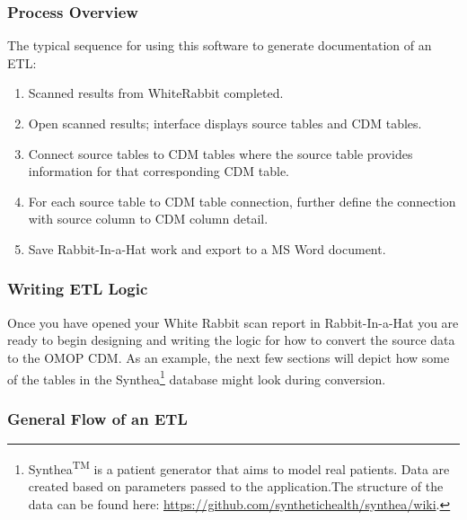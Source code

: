 \documentclass[11pt]{book}
\providecommand{\tightlist}{%
  \setlength{\itemsep}{0pt}\setlength{\parskip}{0pt}}
\let\rmarkdownfootnote\footnote%
\def\footnote{\protect\rmarkdownfootnote}
\theoremstyle{definition}
\theoremstyle{definition}
\theoremstyle{definition}
\theoremstyle{remark}
\begin{document}
\subsubsection*{Process Overview}\label{process-overview-1}

The typical sequence for using this software to generate documentation
of an ETL:

\begin{enumerate}
\def\labelenumi{\arabic{enumi}.}
\tightlist
\item
  Scanned results from WhiteRabbit completed.
\item
  Open scanned results; interface displays source tables and CDM tables.
\item
  Connect source tables to CDM tables where the source table provides
  information for that corresponding CDM table.
\item
  For each source table to CDM table connection, further define the
  connection with source column to CDM column detail.
\item
  Save Rabbit-In-a-Hat work and export to a MS Word document.
\end{enumerate}

\subsubsection*{Writing ETL Logic}\label{writing-etl-logic}

Once you have opened your White Rabbit scan report in Rabbit-In-a-Hat
you are ready to begin designing and writing the logic for how to
convert the source data to the OMOP CDM. As an example, the next few
sections will depict how some of the tables in the Synthea\footnote{Synthea\textsuperscript{TM}
  is a patient generator that aims to model real patients. Data are
  created based on parameters passed to the application.The structure of
  the data can be found here:
  \url{https://github.com/synthetichealth/synthea/wiki}.} database might
look during conversion.

\subsubsection*{General Flow of an ETL}\label{general-flow-of-an-etl}
\end{document}
